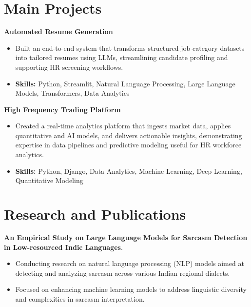 \documentclass[a4paper,11pt]{article}
\begin{document}
\section{\textbf{Main Projects}}

\vspace{1mm}
  \textbf{Automated Resume Generation  }
\vspace{-1.5mm} %
\begin{itemize}
  \item Built an end-to-end system that transforms structured job-category datasets into tailored resumes using LLMs, streamlining candidate profiling and supporting HR screening workflows.
\vspace{-3mm}
  \item \textbf{Skills:} Python, Streamlit, Natural Language Processing, Large Language Models, Transformers, Data Analytics
\end{itemize}


\vspace{1mm}
   \textbf{High Frequency Trading Platform }
\vspace{-1.5mm} %
\begin{itemize}
  \item Created a real-time analytics platform that ingests market data, applies quantitative and AI models, and delivers actionable insights, demonstrating expertise in data pipelines and predictive modeling useful for HR workforce analytics.
\vspace{-3mm}
  \item \textbf{Skills:} Python, Django, Data Analytics, Machine Learning, Deep Learning, Quantitative Modeling
\end{itemize}



\section{\textbf{Research and Publications} \hfill }
\vspace{1mm}
  \textbf{An Empirical Study on Large Language Models for Sarcasm Detection in Low-resourced Indic Languages}.
\vspace{-1mm} %
\begin{itemize}
  \item Conducting research on natural language processing (NLP) models aimed at detecting and analyzing sarcasm across various Indian regional dialects.
\vspace{-3mm}
  \item Focused on enhancing machine learning models to address linguistic diversity and complexities in sarcasm interpretation.
\end{itemize}
\end{document}
